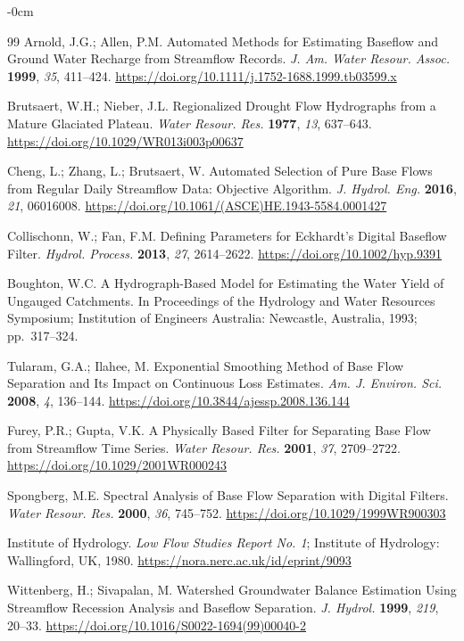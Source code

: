 \documentclass[hydrology,article,submit,pdftex,moreauthors]{Definitions/mdpi}
\begin{document}
\begin{adjustwidth}{-\extralength}{0cm}
\begin{thebibliography}{99}
Arnold, J.G.; Allen, P.M. Automated Methods for Estimating Baseflow and Ground Water Recharge from Streamflow Records. \textit{J. Am. Water Resour. Assoc.} \textbf{1999}, \textit{35}, 411--424. \url{https://doi.org/10.1111/j.1752-1688.1999.tb03599.x}

Brutsaert, W.H.; Nieber, J.L. Regionalized Drought Flow Hydrographs from a Mature Glaciated Plateau. \textit{Water Resour. Res.} \textbf{1977}, \textit{13}, 637--643. \url{https://doi.org/10.1029/WR013i003p00637}

Cheng, L.; Zhang, L.; Brutsaert, W. Automated Selection of Pure Base Flows from Regular Daily Streamflow Data: Objective Algorithm. \textit{J. Hydrol. Eng.} \textbf{2016}, \textit{21}, 06016008. \url{https://doi.org/10.1061/(ASCE)HE.1943-5584.0001427}

Collischonn, W.; Fan, F.M. Defining Parameters for Eckhardt's Digital Baseflow Filter. \textit{Hydrol. Process.} \textbf{2013}, \textit{27}, 2614--2622. \url{https://doi.org/10.1002/hyp.9391}

Boughton, W.C. A Hydrograph-Based Model for Estimating the Water Yield of Ungauged Catchments. In Proceedings of the Hydrology and Water Resources Symposium; Institution of Engineers Australia: Newcastle, Australia, 1993; pp.~317--324.

Tularam, G.A.; Ilahee, M. Exponential Smoothing Method of Base Flow Separation and Its Impact on Continuous Loss Estimates. \textit{Am. J. Environ. Sci.} \textbf{2008}, \textit{4}, 136--144. \url{https://doi.org/10.3844/ajessp.2008.136.144}

Furey, P.R.; Gupta, V.K. A Physically Based Filter for Separating Base Flow from Streamflow Time Series. \textit{Water Resour. Res.} \textbf{2001}, \textit{37}, 2709--2722. \url{https://doi.org/10.1029/2001WR000243}

Spongberg, M.E. Spectral Analysis of Base Flow Separation with Digital Filters. \textit{Water Resour. Res.} \textbf{2000}, \textit{36}, 745--752. \url{https://doi.org/10.1029/1999WR900303}

Institute of Hydrology. \textit{Low Flow Studies Report No. 1}; Institute of Hydrology: Wallingford, UK, 1980. \url{https://nora.nerc.ac.uk/id/eprint/9093}

Wittenberg, H.; Sivapalan, M. Watershed Groundwater Balance Estimation Using Streamflow Recession Analysis and Baseflow Separation. \textit{J. Hydrol.} \textbf{1999}, \textit{219}, 20--33. \url{https://doi.org/10.1016/S0022-1694(99)00040-2}


\end{thebibliography}
\end{adjustwidth}
\end{document}
